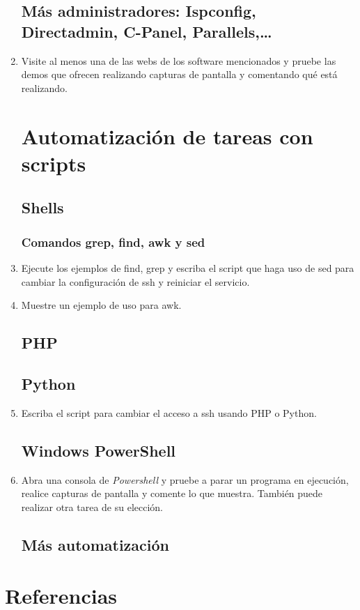 \documentclass[paper=a4, fontsize=11pt]{scrartcl} %
\numberwithin{equation}{section} %
\numberwithin{figure}{section} %
\numberwithin{table}{section} %
\begin{document}
\begin{enumerate}
	\subsection{Más administradores: Ispconfig, Directadmin, C-Panel, Parallels,\dots}
	\item Visite al menos una de las webs de los software mencionados y pruebe las demos que ofrecen
	realizando capturas de pantalla y comentando qué está realizando.
	
	\section{Automatización de tareas con scripts}
	\subsection{Shells}
	\subsubsection*{Comandos grep, find, awk y sed}
	\item Ejecute los ejemplos de find, grep y escriba el script que haga uso de sed para cambiar la
	configuración de ssh y reiniciar el servicio.
	
	\item Muestre un ejemplo de uso para awk.
	
	\subsection{PHP}
	\subsection{Python}
	\item Escriba el script para cambiar el acceso a ssh usando PHP o Python.
	
	\subsection{Windows PowerShell}
	\item Abra una consola de \textit{Powershell} y pruebe a parar un programa en ejecución, realice
	capturas de pantalla y comente lo que muestra. También puede realizar otra tarea de su elección.
	
	\subsection{Más automatización}
	
\end{enumerate}

\newpage
\section{Referencias}

\end{document}
